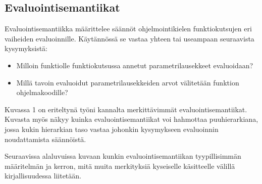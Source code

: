 \subsection{Evaluointisemantiikat}

Evaluointisemantiikka määrittelee säännöt ohjelmointikielen funktiokutsujen eri vaiheiden evaluoinnille. Käytännössä se vastaa yhteen tai useampaan seuraavista kysymyksistä:

\begin{itemize}
    \item Milloin funktiolle funktiokutsussa annetut parametrilausekkeet evaluoidaan?
    \item Millä tavoin evaluoidut parametrilausekkeiden arvot välitetään funktion ohjelmakoodille?
\end{itemize}

Kuvassa 1 on eriteltynä työni kannalta merkittävimmät evaluointisemantiikat. Kuvasta myös näkyy kuinka evaluointisemantiikat voi hahmottaa puuhierarkiana, jossa kukin hierarkian taso vastaa johonkin kysymykseen evaluoinnin noudattamista säännöistä.

Seuraavissa alaluvuissa kuvaan kunkin evaluointisemantiikan tyypillisimmän määritelmän ja kerron, mitä muita merkityksiä kyseiselle käsitteelle välillä kirjallisuudessa liitetään.



